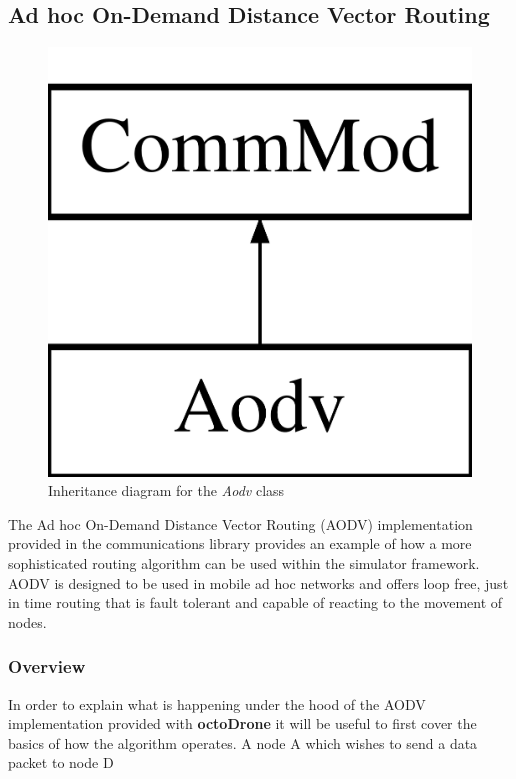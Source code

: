 \subsection{Ad hoc On-Demand Distance Vector Routing}
\begin{figure}
\centering	
\includegraphics[scale=0.2]{../documentation/latex/class_aodv}	
\caption{Inheritance diagram for the \textit{Aodv} class}
\end{figure}

The Ad hoc On-Demand Distance Vector Routing (AODV) implementation provided in the communications library provides an example of how a more sophisticated routing algorithm can be used within the simulator framework. AODV is designed to be used in mobile ad hoc networks and offers loop free, just in time routing that is fault tolerant and capable of reacting to the movement of nodes.

\subsubsection{Overview}
In order to explain what is happening under the hood of the AODV implementation provided with \textbf{octoDrone} it will be useful to first cover the basics of how the algorithm operates. A node A which wishes to send a data packet to node D 